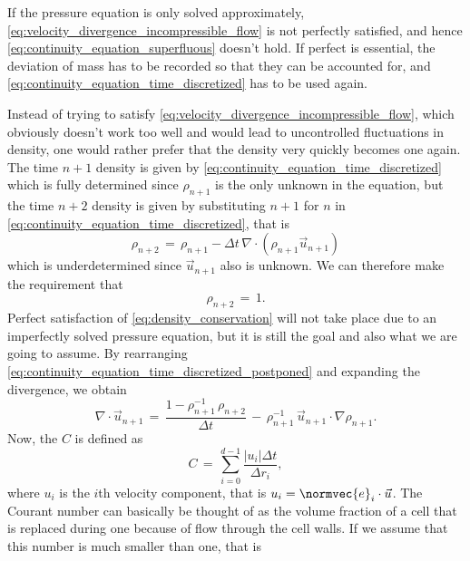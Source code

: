 If the pressure equation is only solved approximately, \eqref{eq:velocity_divergence_incompressible_flow} is not perfectly satisfied, and hence \eqref{eq:continuity_equation_superfluous} doesn't hold. If perfect  is essential, the deviation of mass has to be recorded so that they can be accounted for, and \eqref{eq:continuity_equation_time_discretized} has to be used again.

Instead of trying to satisfy \eqref{eq:velocity_divergence_incompressible_flow}, which obviously doesn't work too well and would lead to uncontrolled fluctuations in density, one would rather prefer that the density very quickly becomes one again. The time $n+1$ density is given by \eqref{eq:continuity_equation_time_discretized} which is fully determined since $\rho_{n+1}$ is the only unknown in the equation, but the time $n+2$ density is given by substituting $n+1$ for $n$ in \eqref{eq:continuity_equation_time_discretized}, that is
%
\begin{equation} \label{eq:continuity_equation_time_discretized_postponed}
\rho_{n+2} \,=\, \rho_{n+1} - \Delta t\,\nabla\cdot(\rho_{n+1}\vec{u}_{n+1})
\end{equation}
%
which is underdetermined since $\vec{u}_{n+1}$ also is unknown. We can therefore make the requirement that
%
\begin{equation} \label{eq:density_conservation}
\rho_{n+2} \,=\, 1.
\end{equation}
%
Perfect satisfaction of \eqref{eq:density_conservation} will not take place due to an imperfectly solved pressure equation, but it is still the goal and also what we are going to assume. By rearranging \eqref{eq:continuity_equation_time_discretized_postponed} and expanding the divergence, we obtain
%
\begin{equation} \label{eq:velocity_divergence_density_conservation_premature}
\nabla\cdot\vec{u}_{n+1} \,=\, \frac{1-\rho_{n+1}^{-1}\,\rho_{n+2}}{\Delta t} \,-\, \rho_{n+1}^{-1}\,\vec{u}_{n+1}\cdot\nabla\rho_{n+1}.
\end{equation}
%
Now, the  $C$ is defined as
%
\begin{equation} \label{eq:courant_number}
C \,=\, \sum_{i=0}^{d-1} \frac{|u_i|\Delta t}{\Delta r_i},
\end{equation}
%
where $u_i$ is the $i$th velocity component, that is $u_i = \normvec{e}_i\cdot\vec{u}$. The Courant number can basically be thought of as the volume fraction of a cell that is replaced during one \timestep because of flow through the cell walls. If we assume that this number is much smaller than one, that is
